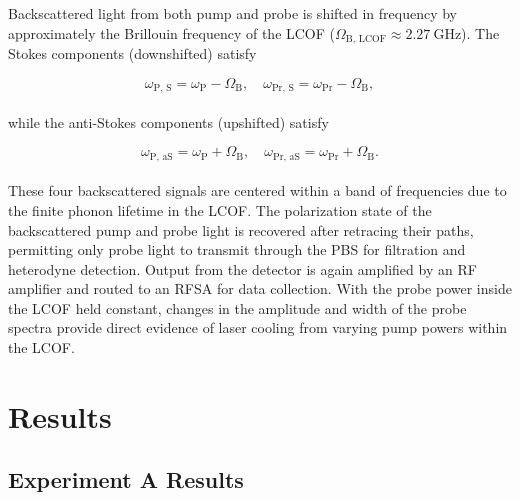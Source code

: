 Backscattered light from both pump and probe is shifted in frequency by approximately the Brillouin frequency of the \ac{LCOF} (\(\Omega_{\mathrm{B,\,LCOF}} \approx \SI{2.27}{\giga\hertz}\)). The Stokes components (downshifted) satisfy

\begin{equation}
\omega_{\mathrm{P,\,S}} = \omega_{\mathrm{P}} - \Omega_{\mathrm{B}},
\quad
\omega_{\mathrm{Pr,\,S}} = \omega_{\mathrm{Pr}} - \Omega_{\mathrm{B}},
\end{equation}
\\
while the anti-Stokes components (upshifted) satisfy

\begin{equation}
\omega_{\mathrm{P,\,aS}} = \omega_{\mathrm{P}} + \Omega_{\mathrm{B}},
\quad
\omega_{\mathrm{Pr,\,aS}} = \omega_{\mathrm{Pr}} + \Omega_{\mathrm{B}}.
\end{equation}
\\
These four backscattered signals are centered within a band of frequencies due to the finite phonon lifetime in the \ac{LCOF}. The polarization state of the backscattered pump and probe light is recovered after retracing their paths, permitting only probe light to transmit through the \ac{PBS} for filtration and heterodyne detection. Output from the detector is again amplified by an \ac{RF} amplifier and routed to an \ac{RFSA} for data collection. With the probe power inside the \ac{LCOF} held constant, changes in the amplitude and width of the probe spectra provide direct evidence of laser cooling from varying pump powers within the \ac{LCOF}.


\section{Results}
\label{Cooling:sec:Results}


\subsection{Experiment A Results}
\label{Cooling:subsec:ExperimentAResults}

